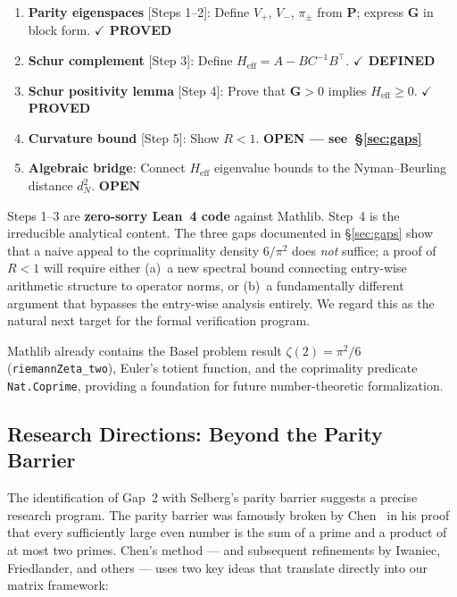 \documentclass[11pt,a4paper]{article}
\theoremstyle{definition}
\theoremstyle{remark}
\newcommand{\Gram}{\mathbf{G}}
\newcommand{\Parity}{\mathbf{P}}
\begin{document}
\begin{enumerate}
  \item \textbf{Parity eigenspaces} [Steps 1--2]: Define $V_+$, $V_-$,
    $\pi_\pm$ from $\Parity$; express $\Gram$ in block form.
    \hfill\textbf{\color{green!50!black}$\checkmark$ PROVED}

  \item \textbf{Schur complement} [Step 3]: Define
    $H_{\mathrm{eff}} = A - BC^{-1}B^\top$.
    \hfill\textbf{\color{green!50!black}$\checkmark$ DEFINED}

  \item \textbf{Schur positivity lemma} [Step 4]: Prove that
    $\Gram > 0$ implies $H_{\mathrm{eff}} \geq 0$.
    \hfill\textbf{\color{green!50!black}$\checkmark$ PROVED}

  \item \textbf{Curvature bound} [Step 5]: Show $R < 1$.
    \hfill\textbf{\color{red!70!black}OPEN --- see~\S\ref{sec:gaps}}

  \item \textbf{Algebraic bridge}: Connect $H_{\mathrm{eff}}$
    eigenvalue bounds to the Nyman--Beurling distance $d_N^2$.
    \hfill\textbf{\color{red!70!black}OPEN}
\end{enumerate}

\noindent Steps 1--3 are \textbf{zero-sorry Lean~4 code} against Mathlib.
Step~4 is the irreducible analytical content. The three gaps documented in
\S\ref{sec:gaps} show that a naive appeal to the coprimality density
$6/\pi^2$ does \emph{not} suffice; a proof of $R < 1$ will require either
(a)~a new spectral bound connecting entry-wise arithmetic structure to
operator norms, or (b)~a fundamentally different argument that bypasses
the entry-wise analysis entirely. We regard this as the natural next
target for the formal verification program.

Mathlib already contains the Basel problem result
$\zeta(2) = \pi^2/6$ (\texttt{riemannZeta\_two}), Euler's totient
function, and the coprimality predicate \texttt{Nat.Coprime}, providing
a foundation for future number-theoretic formalization.

\subsection{Research Directions: Beyond the Parity Barrier}\label{sec:directions}

The identification of Gap~2 with Selberg's parity barrier suggests
a precise research program. The parity barrier was famously broken
by Chen~\cite{chen73} in his proof that every sufficiently large even
number is the sum of a prime and a product of at most two primes.
Chen's method --- and subsequent refinements by Iwaniec, Friedlander,
and others --- uses two key ideas that translate directly into our
matrix framework:
\end{document}

